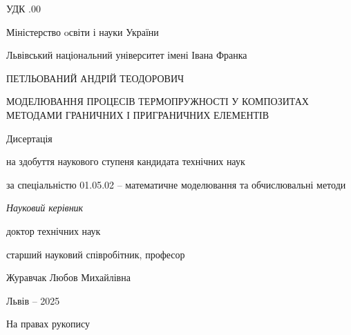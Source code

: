 \documentclass[a4paper,14pt]{extreport}
\begin{document}


\frontmatter 

\thispagestyle{empty}

УДК .00

 \begin{centering}
  \linespread{1.1}
  \vspace{2em}

{Міністерство oсвіти і науки України

Львівський національний університет імені Івана Франка}

  \vspace{5em}

ПЕТЛЬОВАНИЙ АНДРІЙ ТЕОДОРОВИЧ

  \vspace{2em}

МОДЕЛЮВАННЯ ПРОЦЕСІВ ТЕРМОПРУЖНОСТІ У КОМПОЗИТАХ МЕТОДАМИ ГРАНИЧНИХ І ПРИГРАНИЧНИХ ЕЛЕМЕНТІВ

  \vspace{5em}


Дисертація 

на здобуття наукового ступеня кандидата технічних наук

за спеціальністю 01.05.02 -- математичне моделювання та обчислювальні методи


  \vspace{2em}

\textit{Науковий керівник}

доктор технічних наук

старший науковий співробітник, професор

Журавчак Любов Михайлівна

\vspace{11em}

  Львів -- 2025

 \end{centering}
\begin{flushright}
 На правах рукопису
\end{flushright} 

\tableofcontents





\mainmatter %


\end{document}
